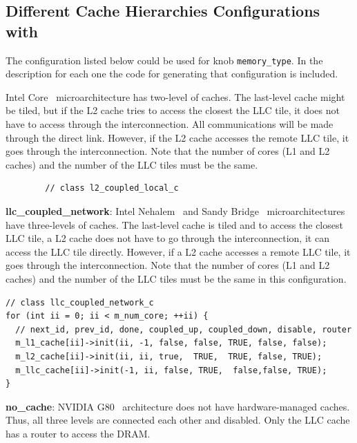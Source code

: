 \subsection{Different Cache Hierarchies Configurations with \SIM}
\label{sec:types_memory}
The configuration listed below could be used for knob \Verb+memory_type+.
In the description for each one the code for generating that configuration is
included.
\begin{itemize}
\ignore
		{
		\item Intel Core~\cite{core2duo} microarchitecture has two-level of
		caches. The last-level cache might be tiled, but if the L2 cache
		tries to access the closest the LLC tile, it does not have to access
		through the interconnection. All communications will be made through
		the direct link. However, if the L2 cache accesses the remote LLC
		tile, it goes through the interconnection. Note that the number of
		cores (L1 and L2 caches) and the number of the LLC tiles must be the
		same.

		\smallskip
		\begin{lstlisting}
		// class l2_coupled_local_c
		\end{lstlisting}
		\smallskip
		 }

\item \textbf{llc\_coupled\_network}: Intel Nehalem~\cite{nehalem} and Sandy
    Bridge~\cite{sandybridge} microarchitectures have three-levels of
    caches. The last-level cache is tiled and to access the closest LLC
    tile, a L2 cache does not have to go through the interconnection,
    it can access the LLC tile directly. However, if a L2 cache
    accesses a remote LLC tile, it goes through the interconnection.
    Note that the number of cores (L1 and L2 caches) and the number of
    the LLC tiles must be the same in this configuration.

\begin{Verbatim}
// class llc_coupled_network_c
for (int ii = 0; ii < m_num_core; ++ii) {
  // next_id, prev_id, done, coupled_up, coupled_down, disable, router
  m_l1_cache[ii]->init(ii, -1, false, false, TRUE, false, false);
  m_l2_cache[ii]->init(ii, ii, true,  TRUE,  TRUE, false, TRUE);
  m_llc_cache[ii]->init(-1, ii, false, TRUE,  false,false, TRUE);
}
\end{Verbatim}

  \item \textbf{no\_cache}: NVIDIA G80~\cite{g80} architecture does not have
  hardware-managed caches. Thus, all three levels are connected each
  other and disabled. Only the LLC cache has a router to access the DRAM.


\end{itemize}
